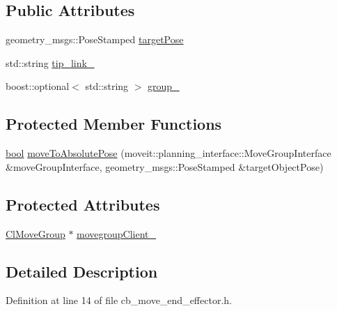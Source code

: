 \subsection*{Public Attributes}
\begin{DoxyCompactItemize}
\item 
geometry\+\_\+msgs\+::\+Pose\+Stamped \hyperlink{classmove__group__interface__client_1_1CbMoveEndEffector_a645e7131ef58ab052efbadf53ea82c59}{target\+Pose}
\item 
std\+::string \hyperlink{classmove__group__interface__client_1_1CbMoveEndEffector_a26d35b0beeb0476a62a46b9b9d659251}{tip\+\_\+link\+\_\+}
\item 
boost\+::optional$<$ std\+::string $>$ \hyperlink{classmove__group__interface__client_1_1CbMoveEndEffector_a91cf66e5db59f176ae7c811cc0ebfb91}{group\+\_\+}
\end{DoxyCompactItemize}
\subsection*{Protected Member Functions}
\begin{DoxyCompactItemize}
\item 
\hyperlink{classbool}{bool} \hyperlink{classmove__group__interface__client_1_1CbMoveEndEffector_a7850f5f9c6fbc040b77e8456a2ecee09}{move\+To\+Absolute\+Pose} (moveit\+::planning\+\_\+interface\+::\+Move\+Group\+Interface \&move\+Group\+Interface, geometry\+\_\+msgs\+::\+Pose\+Stamped \&target\+Object\+Pose)
\end{DoxyCompactItemize}
\subsection*{Protected Attributes}
\begin{DoxyCompactItemize}
\item 
\hyperlink{classmove__group__interface__client_1_1ClMoveGroup}{Cl\+Move\+Group} $\ast$ \hyperlink{classmove__group__interface__client_1_1CbMoveEndEffector_aec44abef326949b57872d68e7b495194}{movegroup\+Client\+\_\+}
\end{DoxyCompactItemize}


\subsection{Detailed Description}


Definition at line 14 of file cb\+\_\+move\+\_\+end\+\_\+effector.\+h.



